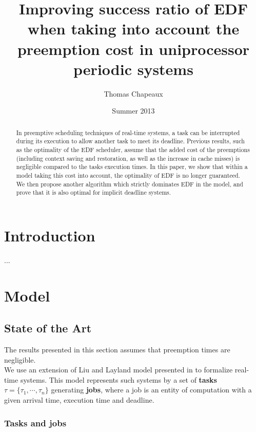 \documentclass[a4paper,10pt]{article}
\title{Improving success ratio of EDF when taking into account the preemption cost in uniprocessor periodic systems}
\author{Thomas Chapeaux}
\date{Summer 2013}
\begin{document}
\maketitle

\tableofcontents

\newpage

\begin{abstract}

In preemptive scheduling techniques of real-time systems, a task can be interrupted during its execution to allow another task to meet its deadline. Previous results, such as the optimality of the EDF scheduler, assume that the added cost of the preemptions (including context saving and restoration, as well as the increase in cache misses) is negligible compared to the tasks execution times. In this paper, we show that within a model taking this cost into account, the optimality of EDF is no longer guaranteed. We then propose another algorithm which strictly dominates EDF in the model, and prove that it is also optimal for implicit deadline systems.

\end{abstract}

\newpage

\section{Introduction}

...

\section{Model}

    \subsection{State of the Art}

        The results presented in this section assumes that preemption times are negligible.\\

        We use an extension of Liu and Layland model presented in \cite{Liu:2000:RS:518501} to formalize real-time systems. This model represents such systems by a set of \textbf{tasks} $\tau = \{\tau_1, \cdots, \tau_n\}$ generating \textbf{jobs}, where a job is an entity of computation with a given arrival time, execution time and deadline.

        \subsubsection{Tasks and jobs}
\end{document}
